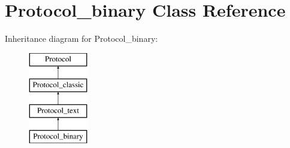 \hypertarget{classProtocol__binary}{}\section{Protocol\+\_\+binary Class Reference}
\label{classProtocol__binary}
Inheritance diagram for Protocol\+\_\+binary\+:\begin{figure}[H]
\begin{center}
\leavevmode
\includegraphics[height=4.000000cm]{classProtocol__binary}
\end{center}
\end{figure}
